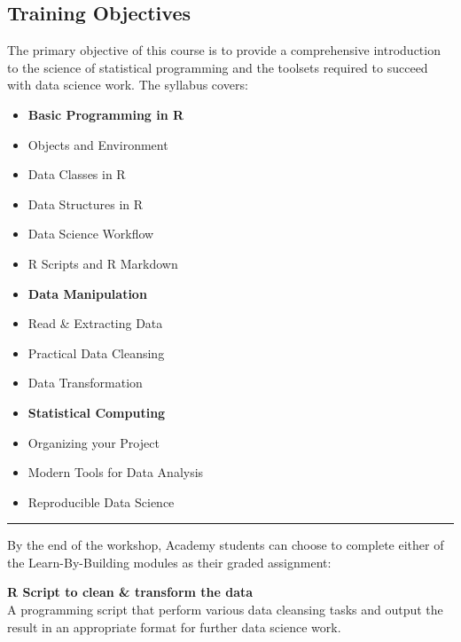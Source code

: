 \documentclass[]{article}
\begin{document}
\hypertarget{training-objectives}{%
\subsection{Training Objectives}\label{training-objectives}}

The primary objective of this course is to provide a comprehensive
introduction to the science of statistical programming and the toolsets
required to succeed with data science work. The syllabus covers:

\begin{itemize}
\item
  \textbf{Basic Programming in R}
\item
  Objects and Environment
\item
  Data Classes in R
\item
  Data Structures in R\\
\item
  Data Science Workflow
\item
  R Scripts and R Markdown
\item
  \textbf{Data Manipulation}\\
\item
  Read \& Extracting Data\\
\item
  Practical Data Cleansing\\
\item
  Data Transformation
\item
  \textbf{Statistical Computing}\\
\item
  Organizing your Project\\
\item
  Modern Tools for Data Analysis\\
\item
  Reproducible Data Science
\end{itemize}

\begin{center}\rule{0.5\linewidth}{0.5pt}\end{center}

By the end of the workshop, Academy students can choose to complete
either of the Learn-By-Building modules as their graded assignment:

\textbf{R Script to clean \& transform the data}\\
A programming script that perform various data cleansing tasks and
output the result in an appropriate format for further data science
work.
\end{document}
